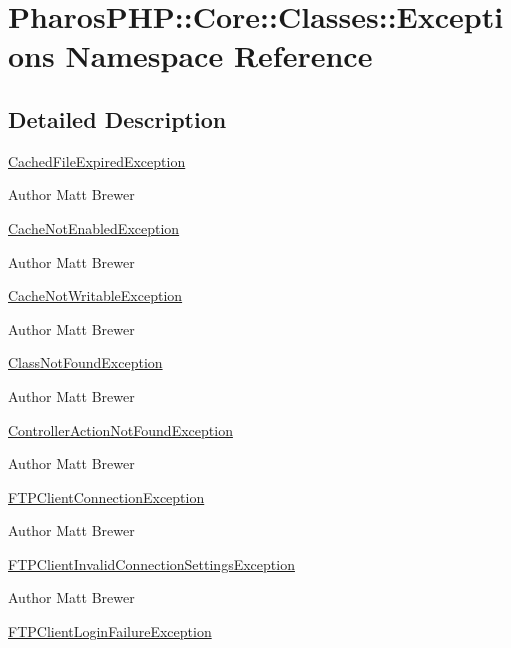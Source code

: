 \hypertarget{namespace_pharos_p_h_p_1_1_core_1_1_classes_1_1_exceptions}{
\section{PharosPHP::Core::Classes::Exceptions Namespace Reference}
\label{namespace_pharos_p_h_p_1_1_core_1_1_classes_1_1_exceptions}
}


\subsection{Detailed Description}
\hyperlink{class_cached_file_expired_exception}{CachedFileExpiredException}

\begin{DoxyAuthor}{Author}
Matt Brewer
\end{DoxyAuthor}
\hyperlink{class_cache_not_enabled_exception}{CacheNotEnabledException}

\begin{DoxyAuthor}{Author}
Matt Brewer
\end{DoxyAuthor}
\hyperlink{class_cache_not_writable_exception}{CacheNotWritableException}

\begin{DoxyAuthor}{Author}
Matt Brewer
\end{DoxyAuthor}
\hyperlink{class_class_not_found_exception}{ClassNotFoundException}

\begin{DoxyAuthor}{Author}
Matt Brewer
\end{DoxyAuthor}
\hyperlink{class_controller_action_not_found_exception}{ControllerActionNotFoundException}

\begin{DoxyAuthor}{Author}
Matt Brewer
\end{DoxyAuthor}
\hyperlink{class_f_t_p_client_connection_exception}{FTPClientConnectionException}

\begin{DoxyAuthor}{Author}
Matt Brewer
\end{DoxyAuthor}
\hyperlink{class_f_t_p_client_invalid_connection_settings_exception}{FTPClientInvalidConnectionSettingsException}

\begin{DoxyAuthor}{Author}
Matt Brewer
\end{DoxyAuthor}
\hyperlink{class_f_t_p_client_login_failure_exception}{FTPClientLoginFailureException}


